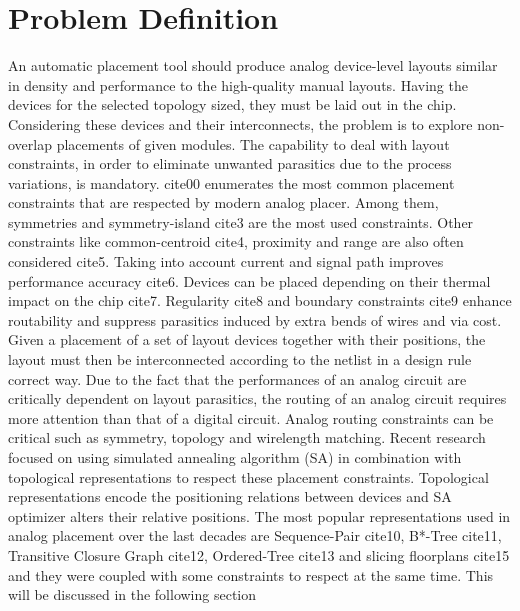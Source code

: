 \chapter{Problem Definition}
An automatic placement tool should produce analog device-level layouts similar in density and performance to the high-quality manual layouts. Having the devices for the selected topology sized, they must be laid out in the chip. Considering these devices and their interconnects, the problem is to explore non-overlap placements of given modules. The capability to deal with layout constraints, in order to eliminate unwanted parasitics due to the process variations, is mandatory. cite{00} enumerates the most common placement constraints that are respected by modern analog placer. Among them, symmetries and symmetry-island cite{3} are the most used constraints. Other constraints like common-centroid cite{4}, proximity and range are also often considered cite{5}. Taking into account current and signal path improves performance accuracy cite{6}. Devices can be placed depending on their thermal impact on the chip cite{7}. Regularity cite{8} and boundary constraints cite{9} enhance routability and suppress parasitics induced by extra bends of wires and via cost.
\newline 
\newline 
\indent Given a placement of a set of layout devices together with their positions, the layout must then be interconnected according to the netlist in a design rule correct way. Due to the fact that the performances of an analog circuit are critically dependent on layout parasitics, the routing of an analog circuit requires more attention than that of a digital circuit. Analog routing constraints can be critical such as symmetry, topology and wirelength matching.
\newline 
\newline 
\indent Recent research focused on using simulated annealing algorithm (SA) in combination with topological representations to respect these placement constraints. Topological representations encode the positioning relations between devices and SA optimizer alters their relative positions. The most popular representations used in analog placement over the last decades are Sequence-Pair cite{10}, B*-Tree cite{11}, Transitive Closure Graph cite{12}, Ordered-Tree cite{13} and slicing floorplans cite{15} and they were coupled with some constraints to respect at the same time. This will be discussed in the following section
